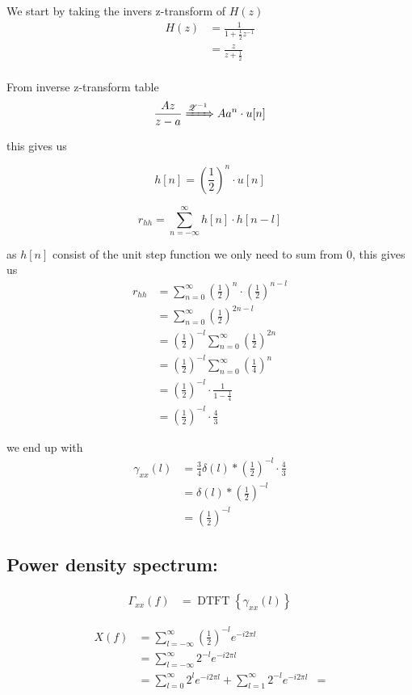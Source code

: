 We start by taking the invers z-transform of $H(z)$
$$
\begin{aligned}
    H(z)&=\frac{1}{1+\frac{1}{2} z^{-1}}\\
    &=\frac{z}{z+\frac{1}{2}}\\
\end{aligned}
$$

From inverse z-transform table
$$\frac{Az}{z-a}\xRightarrow{\mathscr{Z}^{-1}}Aa^n \cdot u[n]$$

this gives us

$$h[n]=\left(\frac{1}{2}\right)^n\cdot u[n]$$

$$r_{hh}=\sum_{n=-\infty}^{\infty}h[n]\cdot h[n-l]$$

as $h[n]$ consist of the unit step function we only need to sum from 0, this gives us 
$$\begin{aligned}
    r_{hh}&=\sum_{n=0}^{\infty}\left(\frac{1}{2}\right)^n\cdot \left(\frac{1}{2}\right)^{n-l}\\
    &=\sum_{n=0}^{\infty}\left(\frac{1}{2}\right)^{2n-l}\\
    &=\left(\frac{1}{2}\right)^{-l}\sum_{n=0}^{\infty}\left(\frac{1}{2}\right)^{2n}\\
    &=\left(\frac{1}{2}\right)^{-l}\sum_{n=0}^{\infty}\left(\frac{1}{4}\right)^{n}\\
    &=\left(\frac{1}{2}\right)^{-l}\cdot\frac{1}{1-\frac{1}{4}}\\
    &=\left(\frac{1}{2}\right)^{-l}\cdot\frac{4}{3}
\end{aligned}$$

we end up with 
$$\begin{aligned}
    \gamma_{x x}(l)&=\frac{3}{4}\delta(l)*\left(\frac{1}{2}\right)^{-l}\cdot\frac{4}{3}\\
    &=\delta(l)*\left(\frac{1}{2}\right)^{-l}\\
    &=\left(\frac{1}{2}\right)^{-l}
\end{aligned}$$

\subsection*{Power density spectrum:}
$$
\begin{aligned}
\Gamma_{x x}(f) & =\operatorname{DTFT}\left\{\gamma_{x x}(l)\right\}
\end{aligned}
$$

$$\begin{aligned}
    X(f)&=\sum_{l=-\infty}^{\infty}\left(\frac{1}{2}\right)^{-l}e^{-i2\pi l}\\
    &=\sum_{l=-\infty}^{\infty}2^{-l}e^{-i2\pi l}\\
    &=\sum_{l=0}^{\infty}2^{l}e^{-i2\pi l}+\sum_{l=1}^{\infty}2^{-l}e^{-i2\pi l}
    &=
\end{aligned}$$



